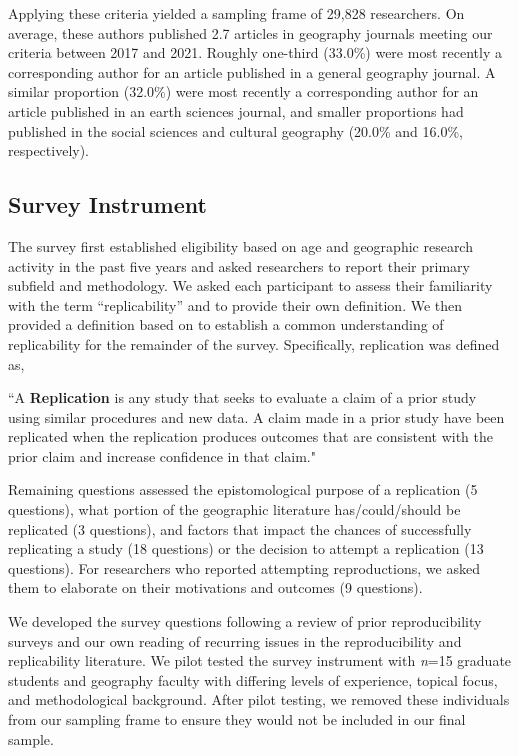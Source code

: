 \documentclass[]{interact}
\theoremstyle{plain}%
\theoremstyle{definition}
\theoremstyle{remark}
\begin{document}
Applying these criteria yielded a sampling frame of 29,828 researchers. 
On average, these authors published 2.7 articles in geography journals meeting our criteria between 2017 and 2021. 
Roughly one-third (33.0\%) were most recently a corresponding author for an article published in a general geography journal. 
A similar proportion (32.0\%) were most recently a corresponding author for an article published in an earth sciences journal, and smaller proportions had published in the social sciences and cultural geography (20.0\% and 16.0\%, respectively).

\subsection*{Survey Instrument}
The survey first established eligibility based on age and geographic research activity in the past five years and asked researchers to report their primary subfield and methodology.
We asked each participant to assess their familiarity with the term ``replicability'' and to provide their own definition. 
We then provided a definition based on \citet{nosek2020} to establish a common understanding of replicability for the remainder of the survey.
Specifically, replication was defined as,

\begin{displayquote}
    ``A \textbf{Replication} is any study that seeks to evaluate a claim of a prior study using similar procedures and new data. A claim made in a prior study have been replicated when the replication produces outcomes that are consistent with the prior claim and increase confidence in that claim."
\end{displayquote}

\noindent Remaining questions assessed the epistomological purpose of a replication (5 questions), what portion of the geographic literature has/could/should be replicated (3 questions), and factors that impact the chances of successfully replicating a study (18 questions) or the decision to attempt a replication (13 questions).
For researchers who reported attempting reproductions, we asked them to elaborate on their motivations and outcomes (9 questions).

We developed the survey questions following a review of prior reproducibility surveys \citep[e.g.,][]{fanelli2009many,baker20161, konkol2019} and our own reading of recurring issues in the reproducibility and replicability literature. 
We pilot tested the survey instrument with \textit{n}=15 graduate students and geography faculty with differing levels of experience, topical focus, and methodological background. 
After pilot testing, we removed these individuals from our sampling frame to ensure they would not be included in our final sample.
\end{document}
